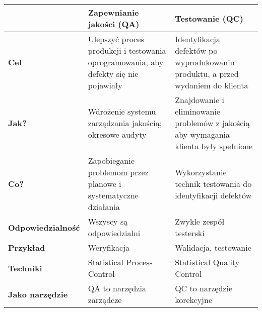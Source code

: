 \documentclass[../main.tex]{subfiles}
\begin{document}
    \begin{table}[H]
        \begin{center}
            \begin{tabular}{| p{3cm} || p{6cm} | p{6cm} |}
                \hline
                & \textbf{Zapewnianie jakości (QA)} & \textbf{Testowanie (QC)}\\
                \hline
                \hline
                \textbf{Cel} & Ulepszyć proces produkcji i testowania oprogramowania,
                aby defekty się nie pojawiały & Identyfikacja defektów po wyprodukowaniu produktu,
                a przed wydaniem do klienta\\
                \hline
                \textbf{Jak?} & Wdrożenie systemu zarządzania jakością; okresowe audyty &
                Znajdowanie i eliminowanie problemów z jakością aby wymagania klienta były spełnione\\
                \hline
                \textbf{Co?} & Zapobieganie problemom przez planowe i systematyczne działania
                & Wykorzystanie technik testowania do identyfikacji defektów\\
                \hline
                \textbf{Odpowiedzialność} & Wszyscy są odpowiedzialni & Zwykle zespół testerski\\
                \hline
                \textbf{Przykład} & Weryfikacja & Walidacja, testowanie\\
                \hline
                \textbf{Techniki} & Statistical Process Control & Statistical Quality Control\\
                \hline
                \textbf{Jako narzędzie} & QA to narzędzia zarządcze & QC to narzędzie korekcyjne\\
                \hline
            \end{tabular}
        \end{center}
    \end{table}
\end{document}
